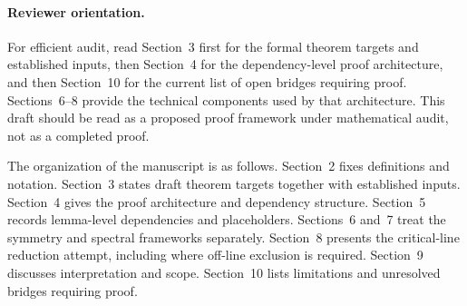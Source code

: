 \paragraph{Reviewer orientation.}
For efficient audit, read Section~3 first for the formal theorem targets and established inputs, then Section~4 for the dependency-level proof architecture, and then Section~10 for the current list of open bridges requiring proof.
Sections~6--8 provide the technical components used by that architecture.
This draft should be read as a proposed proof framework under mathematical audit, not as a completed proof.

The organization of the manuscript is as follows. Section~2 fixes definitions and notation. Section~3 states draft theorem targets together with established inputs. Section~4 gives the proof architecture and dependency structure. Section~5 records lemma-level dependencies and placeholders. Sections~6 and~7 treat the symmetry and spectral frameworks separately. Section~8 presents the critical-line reduction attempt, including where off-line exclusion is required. Section~9 discusses interpretation and scope. Section~10 lists limitations and unresolved bridges requiring proof.

